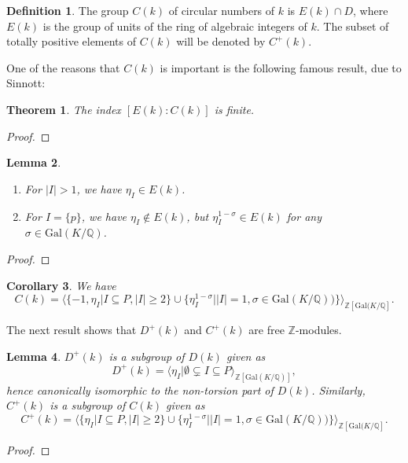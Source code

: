 \documentclass[12pt,a4paper]{article}
\newtheorem{theorem}{Theorem}
\newtheorem{lemma}[theorem]{Lemma}
\newtheorem{cor}[theorem]{Corollary}
\theoremstyle{definition}
\newtheorem{definition}{Definition}[section]
\newcommand{\Q}{\mathbb{Q}}
\newcommand{\Z}{\mathbb{Z}}
\newcommand{\Gal}{\mathrm{Gal}}
\begin{document}
\begin{definition}
The group $C(k)$ of circular numbers of $k$ is $E(k)\cap D$, where $E(k)$ is the group of units of the ring of algebraic integers of $k$. The subset of totally positive elements of $C(k)$ will be denoted by $C^+(k)$.
\end{definition}

One of the reasons that $C(k)$ is important is the following famous result, due to Sinnott:
\begin{theorem}
The index $[E(k):C(k)]$ is finite.
\end{theorem}
\begin{proof}
\end{proof}

\begin{lemma}\leavevmode
\begin{enumerate}%
\item For $|I|>1$, we have $\eta_I\in E(k)$.
\item For $I=\{p\}$, we have $\eta_I\not\in E(k)$, but $\eta_I^{1-\sigma}\in E(k)$ for any $\sigma\in \Gal(K/\Q)$. %
\end{enumerate}
\end{lemma}
\begin{proof}
\end{proof}

\begin{cor}
We have $$C(k)=\big\langle \{ -1, \eta_I \big\vert I \subseteq P,  |I|\geq 2\} \cup \{\eta_I^{1-\sigma} \big\vert |I|=1, \sigma\in \Gal(K/\Q))\}\big\rangle_{\Z[\Gal(K/\Q]}.$$
\end{cor}

The next result shows that $D^+(k)$ and $C^+(k)$ are free $\Z$-modules.
\begin{lemma}
$D^+(k)$ is a subgroup of $D(k)$ given as $$D^+(k)=\big\langle  \eta_I \big\vert \emptyset \subsetneq I \subseteq P\big\rangle_{\Z[\Gal(K/\Q)]},$$
hence canonically isomorphic to the non-torsion part of $D(k)$. Similarly, $C^+(k)$ is a subgroup of $C(k)$ given as $$C^+(k)=\big\langle \{ \eta_I \big\vert I \subseteq P,  |I|\geq 2\} \cup \{\eta_I^{1-\sigma} \big\vert |I|=1, \sigma\in \Gal(K/\Q))\}\big\rangle_{\Z[\Gal(K/\Q]}.$$
\end{lemma}
\begin{proof}
\end{proof}
\end{document}
